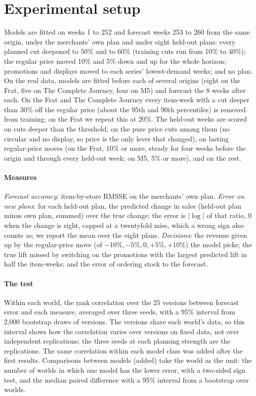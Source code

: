\section{Experimental setup}\label{sec:setup}

Models are fitted on weeks 1 to 252 and forecast weeks 253 to 260 from the same origin, under the merchants' own
plan and under eight held-out plans: every planned cut deepened to 50\% and to 60\% (training cuts run from 10\% to
40\%); the regular price moved 10\% and 5\% down and up for the whole horizon; promotions and displays moved to each
series' lowest-demand weeks; and no plan. On the real data, models are fitted before each of several origins (eight on the Frat, five on The
Complete Journey, four on M5) and forecast the 8 weeks after each. On the Frat and The Complete Journey every
item-week with a cut deeper than 30\% off the regular price (about the 95th and 90th percentiles) is removed from
training; on the Frat we repeat this at 20\%. The held-out weeks are scored on cuts deeper than the threshold, on
the pure price cuts among them (no circular and no display, so price is the only lever that changed), on lasting
regular-price moves (on the Frat, 10\% or more, steady for four weeks before the origin and through every held-out
week; on M5, 5\% or more), and on the rest.

\paragraph{Measures} \emph{Forecast accuracy}: item-by-store RMSSE on the merchants' own plan. \emph{Error on new
plans}: for each held-out plan, the predicted change in sales (held-out plan minus own plan, summed) over the true
change; the error is $|\log|$ of that ratio, 0 when the change is right, capped at a twentyfold miss, which a wrong
sign also counts as; we report the mean over the eight plans. \emph{Decisions}: the revenue given up by the
regular-price move (of $-10\%, -5\%, 0, +5\%, +10\%$) the model picks; the true lift missed by switching on the
promotions with the largest predicted lift in half the item-weeks; and the error of ordering stock to the forecast.

\paragraph{The test} Within each world, the rank correlation over the 25 versions between forecast error and each
measure, averaged over three seeds, with a 95\% interval from 2{,}000 bootstrap draws of versions. The versions share
each world's data, so this interval shows how the correlation varies over versions on fixed data, not over
independent replications; the three seeds at each planning strength are the replications. The same correlation
within each model class was added after the first results. Comparisons between models (added) take the world as the
unit: the number of worlds in which one model has the lower error, with a two-sided sign test, and the median paired
difference with a 95\% interval from a bootstrap over worlds.


